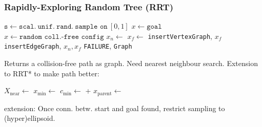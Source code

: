 \subsubsection{Rapidly-Exploring Random Tree (RRT)}
\begin{algorithm}
    \small
    \begin{algorithmic}[1]
            \State {}
                \State $\texttt{s} \gets \texttt{scal.}\ \texttt{unif.}\ \texttt{rand.}\ \texttt{sample on}\ [0, 1]$
                    \State $x \gets \texttt{goal}$
                \Else
                    \State $x \gets \texttt{random coll.-free config}$
                \EndIf
                \State $x_n \gets$ 
                \State $x_f \gets$ 
                    \State \texttt{insertVertex}{\texttt{Graph}, $x_f$}
                    \State {}
                    \State \texttt{insertEdge}{\texttt{Graph}, $x_n, x_f$}
                \EndIf
                    \State {}
                \EndIf
            \EndFor
            \State \Return \texttt{FAILURE}, \texttt{Graph}
        \EndProcedure
    \end{algorithmic}
\end{algorithm}
Returns a collision-free path as graph. Need nearest neighbour search.
Extension to RRT* to make path better:
\begin{algorithm}
    \small
    \begin{algorithmic}[1]
        \State $X_{\text{near}} \gets$ 
        \State $x_{\min} \gets$ 
        \State $c_{\min} \gets$  + 
                \State {}
                \State $x_\text{parent} \gets$ 
                \State {}
            \EndIf
        \EndFor
    \end{algorithmic}
\end{algorithm}

 extension: Once conn. betw. start and goal found, restrict sampling to (hyper)ellipsoid.
